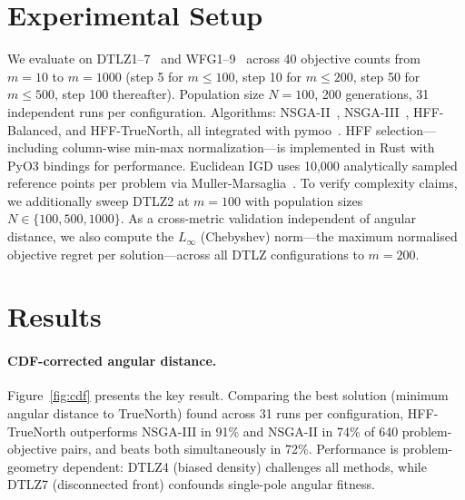 \documentclass[sigconf]{acmart}
\begin{document}
\section{Experimental Setup}
\label{sec:setup}

We evaluate on DTLZ1--7~\cite{deb2005scalable} and WFG1--9~\cite{huband2006review} across 40 objective counts from $m=10$ to $m=1000$ (step 5 for $m \leq 100$, step 10 for $m \leq 200$, step 50 for $m \leq 500$, step 100 thereafter). Population size $N=100$, 200 generations, 31 independent runs per configuration. Algorithms: NSGA-II~\cite{deb2002fast}, NSGA-III~\cite{deb2014evolutionary}, HFF-Balanced, and HFF-TrueNorth, all integrated with pymoo~\cite{blank2020pymoo}. HFF selection---including column-wise min-max normalization---is implemented in Rust with PyO3 bindings for performance. Euclidean IGD uses 10,000 analytically sampled reference points per problem via Muller-Marsaglia~\cite{muller1959}. To verify complexity claims, we additionally sweep DTLZ2 at $m=100$ with population sizes $N \in \{100, 500, 1000\}$. As a cross-metric validation independent of angular distance, we also compute the $L_\infty$ (Chebyshev) norm---the maximum normalised objective regret per solution---across all DTLZ configurations to $m=200$.


\section{Results}
\label{sec:results}

\paragraph{CDF-corrected angular distance.} Figure~\ref{fig:cdf} presents the key result. Comparing the best solution (minimum angular distance to TrueNorth) found across 31 runs per configuration, HFF-TrueNorth outperforms NSGA-III in 91\% and NSGA-II in 74\% of 640 problem-objective pairs, and beats both simultaneously in 72\%. Performance is problem-geometry dependent: DTLZ4 (biased density) challenges all methods, while DTLZ7 (disconnected front) confounds single-pole angular fitness.
\end{document}

